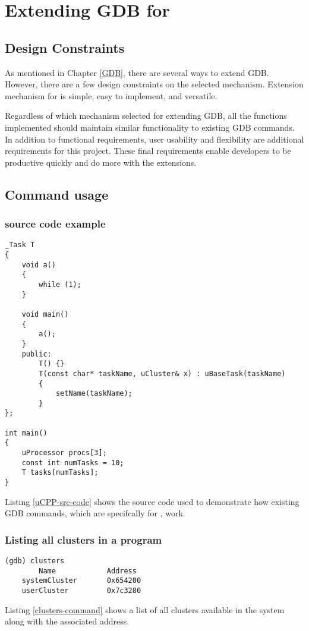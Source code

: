 \chapter{Extending GDB for \uCPP}
\section{Design Constraints}
As mentioned in Chapter \ref{GDB}, there are several ways to extend GDB. However,
there are a few design constraints on the selected mechanism. Extension
mechanism for \uCPPS is simple, easy to implement, and versatile.

Regardless of which mechanism selected for extending GDB, all the functions
implemented should maintain similar functionality to existing GDB commands. In addition to functional
requirements, user usability and flexibility are additional requirements for this
project. These final requirements enable developers to be productive quickly
and do more with the extensions.

\section{Command usage}
\subsection{\uCPPS source code example}
\begin{lstlisting}[caption={\uCPPS source code used for GDB commands},
label={uCPP-src-code}]
_Task T
{
    void a()
    {
        while (1);
    }

    void main()
    {
        a();
    }
    public:
        T() {}
        T(const char* taskName, uCluster& x) : uBaseTask(taskName)
        {
            setName(taskName);
        }
};

int main()
{
    uProcessor procs[3];
    const int numTasks = 10;
    T tasks[numTasks];
}
\end{lstlisting}
Listing \ref{uCPP-src-code} shows the \uCPPS source code used to demonstrate
how existing GDB commands, which are specifcally for \uCPPS, work.
\subsection{Listing all clusters in a \uCPPS program}
\begin{lstlisting}[caption={clusters command}, label={clusters-command}]
(gdb) clusters
        Name            Address
    systemCluster       0x654200
    userCluster         0x7c3280
\end{lstlisting}
Listing \ref{clusters-command} shows a list of all clusters available in the system
along with the associated address.

